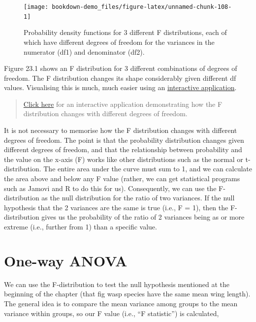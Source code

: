\documentclass[
]{scrbook}
\begin{document}
\begin{figure}
\texttt{[image: bookdown-demo\_files/figure-latex/unnamed-chunk-108-1]} \caption{Probability density functions for 3 different F distributions, each of which have different degrees of freedom for the variances in the numerator (df1) and denominator (df2).}\label{fig:unnamed-chunk-108}
\end{figure}

Figure 23.1 shows an F distribution for 3 different combinations of degrees of freedom.
The F distribution changes its shape considerably given different df values.
Visualising this is much, much easier using an \href{https://bradduthie.shinyapps.io/f_distribution/}{interactive application}.

\begin{quote}
\href{https://bradduthie.shinyapps.io/f_distribution/}{Click here} for an interactive application demonstrating how the F distribution changes with different degrees of freedom.
\end{quote}

It is not necessary to memorise how the F distribution changes with different degrees of freedom.
The point is that the probability distribution changes given different degrees of freedom, and that the relationship between probability and the value on the x-axis (F) works like other distributions such as the normal or t-distribution.
The entire area under the curve must sum to 1, and we can calculate the area above and below any F value (rather, we can get statistical programs such as Jamovi and R to do this for us).
Consequently, we can use the F-distribution as the null distribution for the ratio of two variances.
If the null hypothesis that the 2 variances are the same is true (i.e., F = 1), then the F-distribution gives us the probability of the ratio of 2 variances being as or more extreme (i.e., further from 1) than a specific value.

\hypertarget{one-way-anova}{%
\section{One-way ANOVA}\label{one-way-anova}}

We can use the F-distribution to test the null hypothesis mentioned at the beginning of the chapter (that fig wasp species have the same mean wing length).
The general idea is to compare the mean variance among groups to the mean variance within groups, so our F value (i.e., ``F statistic'') is calculated,
\end{document}
